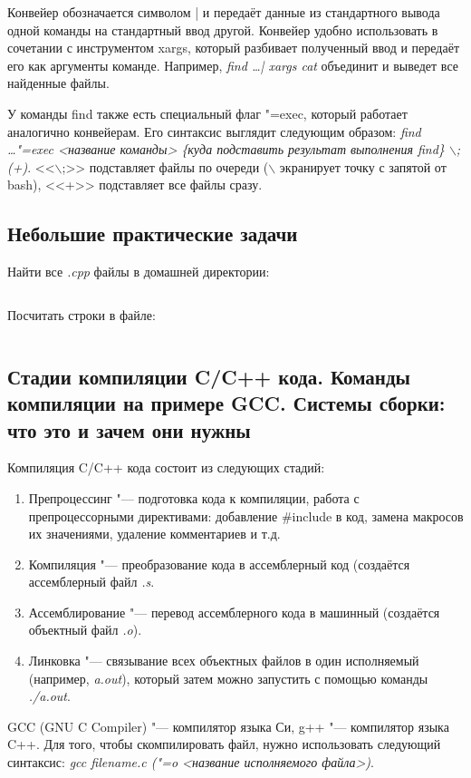 \documentclass[12pt]{article}
\begin{document}
Конвейер обозначается символом | и передаёт данные из стандартного вывода одной команды на стандартный ввод другой. Конвейер удобно использовать в сочетании с инструментом xargs, который разбивает полученный ввод и передаёт его как аргументы команде. Например, \textit{find \dots | xargs cat} объединит и выведет все найденные файлы.

У команды find также есть специальный флаг "=exec, который работает аналогично конвейерам. Его синтаксис выглядит следующим образом: \textit{find \dots "=exec <название команды> \{куда подставить результат выполнения find\} $\backslash$; (+)}. <<$\backslash$;>> подставляет файлы по очереди ($\backslash$ экранирует точку с запятой от bash), <<+>> подставляет все файлы сразу.

\subsection{Небольшие практические задачи}
Найти все \textit{.cpp} файлы в домашней директории:
\inputminted{bash}{exam-findcpp.sh}

Посчитать строки в файле:
\inputminted{bash}{exam-countlines.sh}

\subsection{Стадии компиляции C/C++ кода. Команды компиляции на примере GCC. Системы сборки: что это и зачем они нужны}
Компиляция C/C++ кода состоит из следующих стадий:
\begin{enumerate}
\item Препроцессинг "--- подготовка кода к компиляции, работа с препроцессорными директивами: добавление \#include в код, замена макросов их значениями, удаление комментариев и т.д.
\item Компиляция "--- преобразование кода в ассемблерный код (создаётся ассемблерный файл \textit{.s}.
\item Ассемблирование "--- перевод ассемблерного кода в машинный (создаётся объектный файл \textit{.o}).
\item Линковка "--- связывание всех объектных файлов в один исполняемый (например, \textit{a.out}), который затем можно запустить с помощью команды \textit{./a.out}.
\end{enumerate}

GCC (GNU C Compiler) "--- компилятор языка Си, g++ "--- компилятор языка C++. Для того, чтобы скомпилировать файл, нужно использовать следующий синтаксис: \textit{gcc filename.c ("=o <название исполняемого файла>)}.
\end{document}

